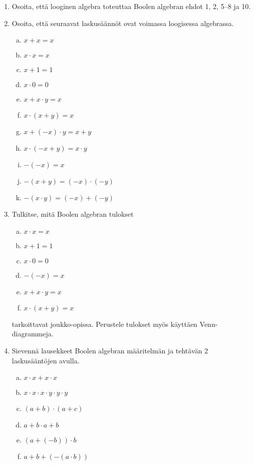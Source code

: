 \begin{tehtavasivu}

\begin{enumerate}

\item Osoita, että looginen algebra toteuttaa Boolen algebran ehdot 1, 2, 5--8 ja 10.

\item Osoita, että seuraavat laskusäännöt ovat voimassa loogisessa algebrassa.
\begin{enumerate}[a)]
\item $x + x = x$
\item $x \cdot x = x$
\item $x + 1 = 1$
\item $x \cdot 0 = 0$
\item $x + x \cdot y = x$
\item $x \cdot (x + y) = x$
\item $x + (-x) \cdot y = x + y$
\item $x \cdot (-x + y) = x \cdot y$
\item $-(-x) = x$
\item $-(x + y) = (-x) \cdot (-y)$
\item $-(x \cdot y) = (-x) + (-y)$
\end{enumerate}

\item
Tulkitse, mitä Boolen algebran tulokset
\begin{enumerate}[a)]
\item $x \cdot x = x$
\item $x + 1 = 1$
\item $x \cdot 0 = 0$
\item $-(-x) = x$
\item $x + x \cdot y = x$
\item $x \cdot (x + y) = x$
\end{enumerate}
tarkoittavat joukko-opissa. Perustele tulokset myös käyttäen Venn-diagrammeja.

\item
Sievennä lausekkeet Boolen algebran määritelmän ja tehtävän 2 laskusääntöjen avulla.
\begin{enumerate}[a)]
\item $x \cdot x + x \cdot x$
\item $x \cdot x \cdot x \cdot y \cdot y \cdot y$
\item $(a + b) \cdot (a + c)$
\item $a + b \cdot a + b$
\item $(a + (-b)) \cdot b$
\item $a + b + (-(a \cdot b))$
\end{enumerate}


\end{enumerate}
\end{tehtavasivu}
